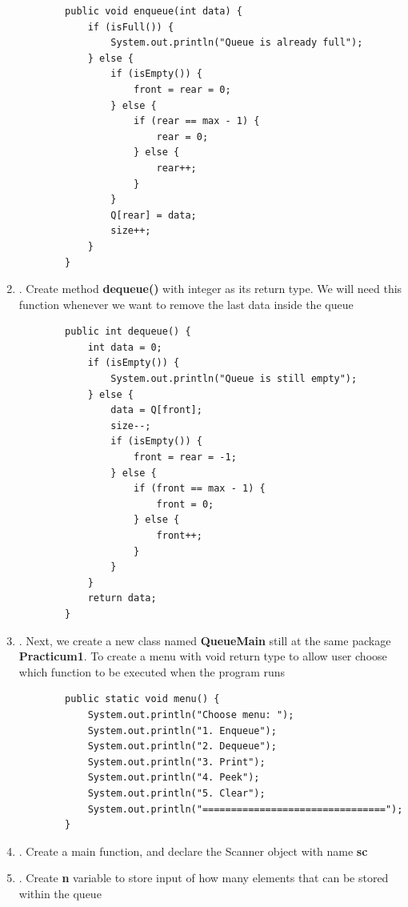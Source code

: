 \documentclass[12pt,titlepage]{article}
\begin{document}
\begin{enumerate}
    \begin{verbatim}
        public void enqueue(int data) {
            if (isFull()) {
                System.out.println("Queue is already full");
            } else {
                if (isEmpty()) {
                    front = rear = 0;
                } else {
                    if (rear == max - 1) {
                        rear = 0;
                    } else {
                        rear++;
                    }
                }
                Q[rear] = data;
                size++;
            }
        }
    \end{verbatim}
    \item. Create method \textbf{dequeue()} with integer as its return type. We will need this function whenever we want to remove the last data inside the queue
    \begin{verbatim}
        public int dequeue() {
            int data = 0;
            if (isEmpty()) {
                System.out.println("Queue is still empty");
            } else {
                data = Q[front];
                size--;
                if (isEmpty()) {
                    front = rear = -1;
                } else {
                    if (front == max - 1) {
                        front = 0;
                    } else {
                        front++;
                    }
                }
            }
            return data;
        }
    \end{verbatim}
    \item. Next, we create a new class named \textbf{QueueMain} still at the same package \textbf{Practicum1}. To create a menu with void return type to allow user choose which function to be executed when the program runs
    \begin{verbatim}
        public static void menu() {
            System.out.println("Choose menu: ");
            System.out.println("1. Enqueue");
            System.out.println("2. Dequeue");
            System.out.println("3. Print");
            System.out.println("4. Peek");
            System.out.println("5. Clear");
            System.out.println("================================");
        }
    \end{verbatim}
    \item. Create a main function, and declare the Scanner object with name \textbf{sc}
    \item. Create \textbf{n} variable to store input of how many elements that can be stored within the queue

\end{enumerate}
\end{document}
